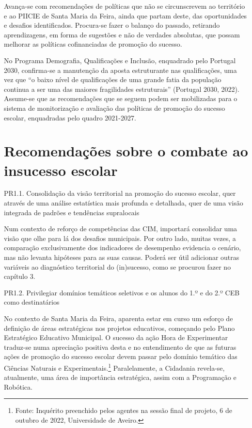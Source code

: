 \documentclass[
]{book}
\begin{document}
Avança-se com recomendações de políticas que não se circunscrevem ao território e ao PIICIE de Santa Maria da Feira, ainda que partam deste, das oportunidades e desafios identificados. Procura-se fazer o balanço do passado, retirando aprendizagens, em forma de sugestões e não de verdades absolutas, que possam melhorar as políticas cofinanciadas de promoção do sucesso.

No Programa Demografia, Qualificações e Inclusão, enquadrado pelo Portugal 2030, confirma-se a manutenção da aposta estruturante nas qualificações, uma vez que ``o baixo nível de qualificações de uma grande fatia da população continua a ser uma das maiores fragilidades estruturais'' (Portugal 2030, 2022). Assume-se que as recomendações que se seguem podem ser mobilizadas para o sistema de monitorização e avaliação das políticas de promoção do sucesso escolar, enquadradas pelo quadro 2021-2027.

\hypertarget{recomendauxe7uxf5es-sobre-o-combate-ao-insucesso-escolar}{%
\section{\texorpdfstring{\textbf{Recomendações sobre o combate ao insucesso escolar}}{Recomendações sobre o combate ao insucesso escolar}}\label{recomendauxe7uxf5es-sobre-o-combate-ao-insucesso-escolar}}

\leavevmode{}%
PR1.1. Consolidação da visão territorial na promoção do sucesso escolar, quer através de uma análise estatística mais profunda e detalhada, quer de uma visão integrada de padrões e tendências supralocais

Num contexto de reforço de competências das CIM, importará consolidar uma visão que olhe para lá dos desafios municipais. Por outro lado, muitas vezes, a comparação exclusivamente dos indicadores de desempenho evidencia o cenário, mas não levanta hipóteses para as suas causas. Poderá ser útil adicionar outras variáveis ao diagnóstico territorial do (in)sucesso, como se procurou fazer no capítulo 3.

\leavevmode{}%
PR1.2. Privilegiar domínios temáticos seletivos e os alunos do 1.º e do 2.º CEB como destinatários

No contexto de Santa Maria da Feira, aparenta estar em curso um esforço de definição de áreas estratégicas nos projetos educativos, começando pelo Plano Estratégico Educativo Municipal. O sucesso da ação Hora de Experimentar traduz-se numa apreciação positiva desta e no entendimento de que as futuras ações de promoção do sucesso escolar devem passar pelo domínio temático das Ciências Naturais e Experimentais.\footnote{Fonte: Inquérito preenchido pelos agentes na sessão final de projeto, 6 de outubro de 2022, Universidade de Aveiro.} Paralelamente, a Cidadania revela-se, atualmente, uma área de importância estratégica, assim com a Programação e Robótica.
\end{document}
